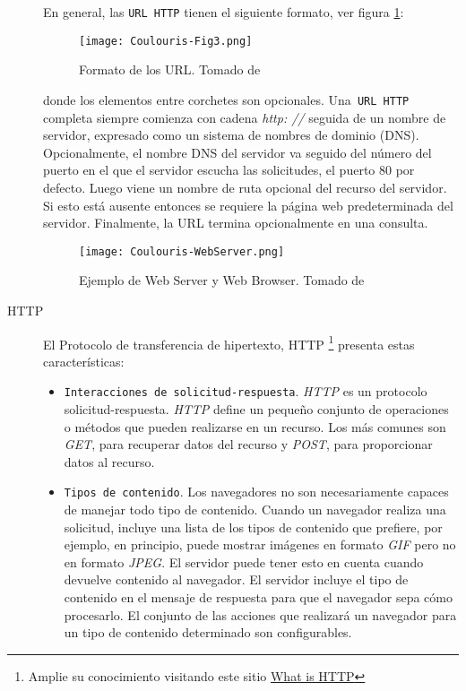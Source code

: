 \begin{description}
		En general, las \texttt{URL HTTP} tienen el siguiente formato, ver figura \ref{fig:Cou-Fig3}:
	
	\begin{figure}%
		\texttt{[image: Coulouris-Fig3.png]}
		\caption{ Formato de los URL. Tomado de \CO }
		\label{fig:Cou-Fig3}
	\end{figure}
	
	donde los elementos entre corchetes son opcionales. Una\texttt{ URL HTTP} completa siempre comienza con cadena \textit{http: //} seguida de un nombre de servidor, expresado como un sistema de nombres de dominio (DNS). Opcionalmente, el nombre \gls{DNS} del servidor va seguido del número del puerto en el que el servidor escucha las solicitudes,  el puerto 80 por 	defecto. Luego viene un nombre de ruta opcional del recurso del servidor. Si esto está ausente entonces se requiere la página web predeterminada del servidor. Finalmente, la URL termina opcionalmente en una consulta. 
	
	
	\begin{figure}
		\texttt{[image: Coulouris-WebServer.png]}
		\caption{Ejemplo de Web Server y Web Browser. Tomado de \CO}
		\label{fig:WebServer-Exa}
	\end{figure}
	
	\item[{HTTP}]  El Protocolo de transferencia de hipertexto, \gls{HTTP} \footnote{Amplie su conocimiento visitando este sitio \href{https://www.w3schools.com/whatis/whatis_http.asp} {What is HTTP}  } presenta estas caracter\'isticas:
	
	\begin{itemize}
		\item \texttt{Interacciones de solicitud-respuesta}.  \textit{HTTP} es un \gls{protocolo solicitud-respuesta}.  \textit{HTTP} define un pequeño conjunto de operaciones o métodos que pueden 	realizarse en un recurso. Los más comunes son \textit{GET}, para recuperar datos del recurso y \textit{POST}, para proporcionar datos al recurso.
		
		\item \texttt{Tipos de contenido}. Los navegadores no son necesariamente capaces de manejar todo tipo de
		contenido. Cuando un navegador realiza una solicitud, incluye una lista de los tipos de contenido que prefiere, por ejemplo, en principio, puede mostrar imágenes en formato \textit{GIF} 		
		pero no en formato \textit{JPEG}. El servidor puede tener esto en cuenta cuando devuelve contenido al navegador. El servidor incluye el tipo de contenido en el mensaje de respuesta para que el navegador sepa cómo procesarlo. El conjunto de las acciones que realizará un navegador para un tipo de contenido determinado son configurables.
		

\end{itemize}
\end{description}
